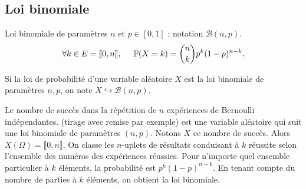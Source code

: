 \subsection{Loi binomiale}  
\begin{defi}
Loi binomiale de paramètres $n$ et $p\in [0,1]$ : notation $\mathcal{B}(n,p)$.
\begin{displaymath}
\forall k \in E=\llbracket 0 , n\rrbracket, \hspace{0.5cm} \mathbb{P}(X=k) = \binom{n}{k}p^k(1-p)^{n-k}. 
\end{displaymath}  
\end{defi}
\begin{nota}
Si la loi de probabilité d'une variable aléatoire $X$ est la loi binomiale de paramètres $n,p$, on note $X\hookrightarrow \mathcal{B}(n,p)$.
\end{nota}
\begin{exple}
  Le nombre de succès dans la répétition de $n$ expériences de Bernoulli indépendantes. (tirage avec remise par exemple) est une variable aléatoire qui suit une loi binomiale de paramètres $(n,p)$.\newline
  Notons $X$ ce nombre de succès. Alors $X(\Omega) = \llbracket 0, n\rrbracket$. On classe les $n$-uplets de résultats conduisant à $k$ réussite selon l'ensemble des numéros des expériences réussies. Pour n'importe quel ensemble particulier à $k$ éléments, la probabilité est $p^k(1-p)^{n-k}$. En tenant compte du nombre de parties à $k$ éléments, on obtient la loi binomiale. 
\end{exple}
\newpage
